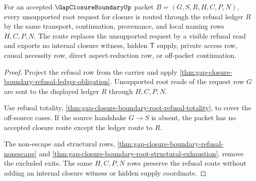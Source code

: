 \begin{theorem}\label{thm:gap-closure-boundary-root-ledger-routing}
For an accepted $\GapClosureBoundaryUp$ packet $B=(G,S,R,H,C,P,N)$, every unsupported root request for closure is routed through the refusal ledger $R$ by the same transport, continuation, provenance, and local naming rows $H,C,P,N$. The route replaces the unsupported request by a visible refusal read and exports no internal closure witness, hidden $\mathsf{T}$ supply, private access row, causal necessity row, direct aspect-reduction row, or off-packet continuation.
\end{theorem}
\begin{proof}
Project the refusal row from the carrier and apply \autoref{thm:gap-closure-boundary-refusal-ledger-obligation}. Unsupported root reads of the request row $G$ are sent to the displayed ledger $R$ through $H,C,P,N$.

Use refusal totality, \autoref{thm:gap-closure-boundary-root-refusal-totality}, to cover the off-source cases. If the source handshake $G \longrightarrow S$ is absent, the packet has no accepted closure route except the ledger route to $R$.

The non-escape and structural rows, \autoref{thm:gap-closure-boundary-refusal-nonescape} and \autoref{thm:gap-closure-boundary-root-structural-exhaustion}, remove the excluded exits. The same $H,C,P,N$ rows preserve the refusal route without adding an internal closure witness or hidden supply coordinate.
\end{proof}

